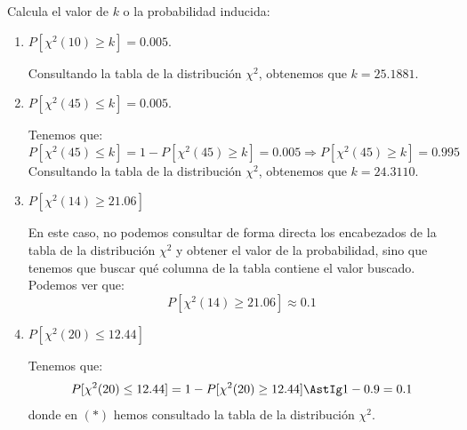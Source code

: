 \begin{ejercicio}
    Calcula el valor de $k$ o la probabilidad inducida:
    \begin{enumerate}[label=\alph*)]
        \item $P[\chi^2(10)\geq k] = 0.005$.

            Consultando la tabla de la distribución $\chi^2$, obtenemos que $k = 25.1881$.
        \item $P[\chi^2(45) \leq k] = 0.005$.
        
            Tenemos que:
            \begin{equation*}
                P[\chi^2(45) \leq k] = 1-P[\chi^2(45) \geq k] = 0.005 \Longrightarrow
                P[\chi^2(45) \geq k] = 0.995
            \end{equation*}
            Consultando la tabla de la distribución $\chi^2$, obtenemos que $k = 24.3110$.
        
        \item $P[\chi^2(14) \geq 21.06]$
        
            En este caso, no podemos consultar de forma directa los encabezados de la tabla de la distribución $\chi^2$ y obtener el valor de la probabilidad, sino que tenemos que buscar qué columna de la tabla contiene el valor buscado. Podemos ver que:
            \begin{equation*}
                P[\chi^2(14) \geq 21.06] \approx 0.1
            \end{equation*}
            
        \item $P[\chi^2(20) \leq 12.44]$
        
            Tenemos que:
            \begin{equation*}
                P[\chi^2(20) \leq 12.44] = 1-P[\chi^2(20) \geq 12.44] \AstIg 1-0.9 = 0.1
            \end{equation*}
            donde en $(\ast)$ hemos consultado la tabla de la distribución $\chi^2$.
    \end{enumerate}
\end{ejercicio}

